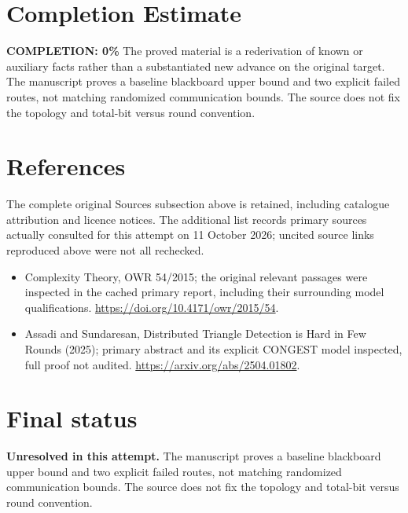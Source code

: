 \documentclass[11pt]{article}
\begin{document}
\section{Completion Estimate}
\noindent\textbf{COMPLETION: 0\%}
The proved material is a rederivation of known or auxiliary facts rather than a substantiated new advance on the original target. The manuscript proves a baseline blackboard upper bound and two explicit failed routes, not matching randomized communication bounds. The source does not fix the topology and total-bit versus round convention.
\section{References}
The complete original Sources subsection above is retained, including catalogue attribution and licence notices. The additional list records primary sources actually consulted for this attempt on 11 October 2026; uncited source links reproduced above were not all rechecked.
\begin{itemize}
\item Complexity Theory, OWR 54/2015; the original relevant passages were inspected in the cached primary report, including their surrounding model qualifications. \url{https://doi.org/10.4171/owr/2015/54}.
\item Assadi and Sundaresan, Distributed Triangle Detection is Hard in Few Rounds (2025); primary abstract and its explicit CONGEST model inspected, full proof not audited. \url{https://arxiv.org/abs/2504.01802}.
\end{itemize}
\section{Final status}
\textbf{Unresolved in this attempt.} The manuscript proves a baseline blackboard upper bound and two explicit failed routes, not matching randomized communication bounds. The source does not fix the topology and total-bit versus round convention.
\end{document}
